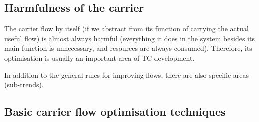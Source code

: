 \documentclass[a4paper,11pt]{article}
\begin{document}
\subsection{Harmfulness of the carrier}

The carrier flow by itself (if we abstract from its function of carrying the
actual useful flow) is almost always harmful (everything it does in the system
besides its main function is unnecessary, and resources are always consumed).
Therefore, its optimisation is usually an important area of TC development.

In addition to the general rules for improving flows, there are also specific
areas (sub-trends).

\subsection{Basic carrier flow optimisation techniques}
\end{document}
